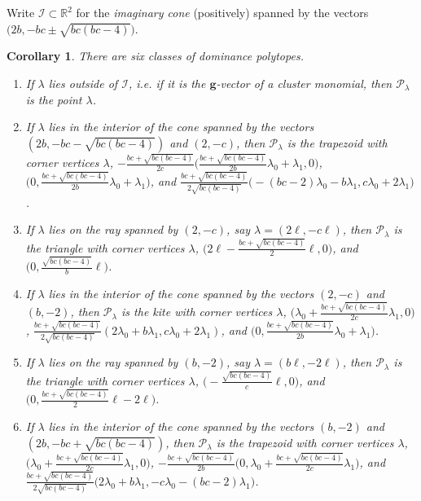 \documentclass{amsart}
\newtheorem{corollary}[theorem]{Corollary}
\numberwithin{theorem}{section}
\newcommand{\bfg}{\boldsymbol{g}}
\newcommand{\cI}{\mathcal{I}}
\newcommand{\cP}{\mathcal{P}}
\newcommand{\RR}{\mathbb{R}}
\begin{document}
  Write $\cI \subset \RR^2$ for the \emph{imaginary cone} (positively) spanned by the vectors $\big(2b,-bc\pm\sqrt{bc(bc-4)}\big)$.
  \begin{corollary}
    \label{cor:dominance vertices}
    There are six classes of dominance polytopes.
    \begin{enumerate}
      \item If $\lambda$ lies outside of $\cI$, i.e. if it is the $\bfg$-vector of a cluster monomial, then $\cP_\lambda$ is the point $\lambda$. 
      \item If $\lambda$ lies in the interior of the cone spanned by the vectors $(2b,-bc-\sqrt{bc(bc-4)})$ and $(2,-c)$, then $\cP_\lambda$ is the trapezoid with corner vertices $\lambda$, $-\frac{bc+\sqrt{bc(bc-4)}}{2c}\big(\frac{bc+\sqrt{bc(bc-4)}}{2b}\lambda_0+\lambda_1,0\big)$, $\big(0,\frac{bc+\sqrt{bc(bc-4)}}{2b}\lambda_0+\lambda_1\big)$, and $\frac{bc+\sqrt{bc(bc-4)}}{2\sqrt{bc(bc-4)}}\big(-(bc-2)\lambda_0-b\lambda_1,c\lambda_0+2\lambda_1\big)$.
      \item If $\lambda$ lies on the ray spanned by $(2,-c)$, say $\lambda=(2\ell,-c\ell)$, then $\cP_\lambda$ is the triangle with corner vertices $\lambda$, $\big(2\ell-\frac{bc+\sqrt{bc(bc-4)}}{2}\ell,0\big)$, and $\big(0,\frac{\sqrt{bc(bc-4)}}{b}\ell\big)$.
      \item If $\lambda$ lies in the interior of the cone spanned by the vectors $(2,-c)$ and $(b,-2)$, then $\cP_\lambda$ is the kite with corner vertices $\lambda$, $\big(\lambda_0+\frac{bc+\sqrt{bc(bc-4)}}{2c}\lambda_1,0\big)$, $\frac{bc+\sqrt{bc(bc-4)}}{2\sqrt{bc(bc-4)}}(2\lambda_0+b\lambda_1,c\lambda_0+2\lambda_1)$, and $\big(0,\frac{bc+\sqrt{bc(bc-4)}}{2b}\lambda_0+\lambda_1\big)$.
      \item If $\lambda$ lies on the ray spanned by $(b,-2)$, say $\lambda=(b\ell,-2\ell)$, then $\cP_\lambda$ is the triangle with corner vertices $\lambda$, $\big(-\frac{\sqrt{bc(bc-4)}}{c}\ell,0\big)$, and $\big(0,\frac{bc+\sqrt{bc(bc-4)}}{2}\ell-2\ell\big)$.
      \item If $\lambda$ lies in the interior of the cone spanned by the vectors $(b,-2)$ and $(2b,-bc+\sqrt{bc(bc-4)})$, then $\cP_\lambda$ is the trapezoid with corner vertices $\lambda$, $\big(\lambda_0+\frac{bc+\sqrt{bc(bc-4)}}{2c}\lambda_1,0\big)$, $-\frac{bc+\sqrt{bc(bc-4)}}{2b}\big(0,\lambda_0+\frac{bc+\sqrt{bc(bc-4)}}{2c}\lambda_1\big)$, and $\frac{bc+\sqrt{bc(bc-4)}}{2\sqrt{bc(bc-4)}}\big(2\lambda_0+b\lambda_1,-c\lambda_0-(bc-2)\lambda_1\big)$.
    \end{enumerate}
  \end{corollary}
\end{document}
